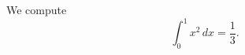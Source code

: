 \documentclass{article}
\begin{document}
We compute
\[
\int_0^1 x^2 \, dx = \frac{1}{3}.
\]
\end{document}
